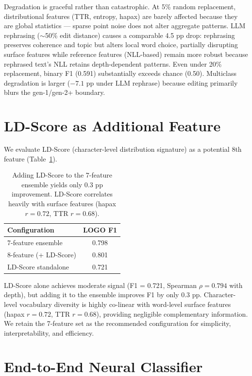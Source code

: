 \documentclass[11pt,twocolumn]{article}
\begin{document}
Degradation is graceful rather than catastrophic.
At 5\% random replacement, distributional features (TTR, entropy, hapax) are barely affected because they are global statistics --- sparse point noise does not alter aggregate patterns.
LLM rephrasing ($\sim$50\% edit distance) causes a comparable 4.5 pp drop: rephrasing preserves coherence and topic but alters local word choice, partially disrupting surface features while reference features (NLL-based) remain more robust because rephrased text's NLL retains depth-dependent patterns.
Even under 20\% replacement, binary F1 (0.591) substantially exceeds chance (0.50).
Multiclass degradation is larger ($-7.1$ pp under LLM rephrase) because editing primarily blurs the gen-1/gen-2+ boundary.


\section{LD-Score as Additional Feature}
\label{sec:ldscore}

We evaluate LD-Score (character-level distribution signature) as a potential 8th feature (Table~\ref{tab:ldscore}).

\begin{table}[h]
\centering
\small
\begin{tabular}{lc}
\toprule
\textbf{Configuration} & \textbf{LOGO F1} \\
\midrule
7-feature ensemble & 0.798 \\
8-feature (+ LD-Score) & 0.801 \\
LD-Score standalone & 0.721 \\
\bottomrule
\end{tabular}
\caption{Adding LD-Score to the 7-feature ensemble yields only 0.3 pp improvement. LD-Score correlates heavily with surface features (hapax $r = 0.72$, TTR $r = 0.68$).}
\label{tab:ldscore}
\end{table}

LD-Score alone achieves moderate signal (F1 = 0.721, Spearman $\rho = 0.794$ with depth), but adding it to the ensemble improves F1 by only 0.3 pp.
Character-level vocabulary diversity is highly co-linear with word-level surface features (hapax $r = 0.72$, TTR $r = 0.68$), providing negligible complementary information.
We retain the 7-feature set as the recommended configuration for simplicity, interpretability, and efficiency.


\section{End-to-End Neural Classifier}
\label{sec:qlora}
\end{document}

